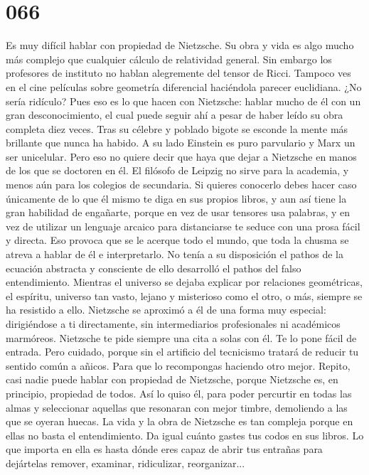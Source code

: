 \documentclass[a4paper,11pt,openright,twocolumn]{book}
\begin{document}
\section*{066}

Es muy difícil hablar con propiedad de Nietzsche. Su obra y vida es algo mucho más complejo que cualquier cálculo de relatividad general. Sin embargo los profesores de instituto no hablan alegremente del tensor de Ricci. Tampoco ves en el cine películas sobre geometría diferencial haciéndola parecer euclidiana. ¿No sería ridículo? Pues eso es lo que hacen con Nietzsche: hablar mucho de él con un gran desconocimiento, el cual puede seguir ahí a pesar de haber leído su obra completa diez veces. Tras su célebre y poblado bigote se esconde la mente más brillante que nunca ha habido. A su lado Einstein es puro parvulario y Marx un ser unicelular. Pero eso no quiere decir que haya que dejar a Nietzsche en manos de los que se doctoren en él. El filósofo de Leipzig no sirve para la academia, y menos aún para los colegios de secundaria. Si quieres conocerlo debes hacer caso únicamente de lo que él mismo te diga en sus propios libros, y aun así tiene la gran habilidad de engañarte, porque en vez de usar tensores usa palabras, y en vez de utilizar un lenguaje arcaico para distanciarse te seduce con una prosa fácil y directa. Eso provoca que se le acerque todo el mundo, que toda la chusma se atreva a hablar de él e interpretarlo. No tenía a su disposición el pathos de la ecuación abstracta y consciente de ello desarrolló el pathos del falso entendimiento. Mientras el universo se dejaba explicar por relaciones geométricas, el espíritu, universo tan vasto, lejano y misterioso como el otro, o más, siempre se ha resistido a ello. Nietzsche se aproximó a él de una forma muy especial: dirigiéndose a ti directamente, sin intermediarios profesionales ni académicos marmóreos. Nietzsche te pide siempre una cita a solas con él. Te lo pone fácil de entrada. Pero cuidado, porque sin el artificio del tecnicismo tratará de reducir tu sentido común a añicos. Para que lo recompongas haciendo otro mejor. Repito, casi nadie puede hablar con propiedad de Nietzsche, porque Nietzsche es, en principio, propiedad de todos. Así lo quiso él, para poder percurtir en todas las almas y seleccionar aquellas que resonaran con mejor timbre, demoliendo a las que se oyeran huecas. La vida y la obra de Nietzsche es tan compleja porque en ellas no basta el entendimiento. Da igual cuánto gastes tus codos en sus libros. Lo que importa en ella es hasta dónde eres capaz de abrir tus entrañas para dejártelas remover, examinar, ridiculizar, reorganizar...
\end{document}
